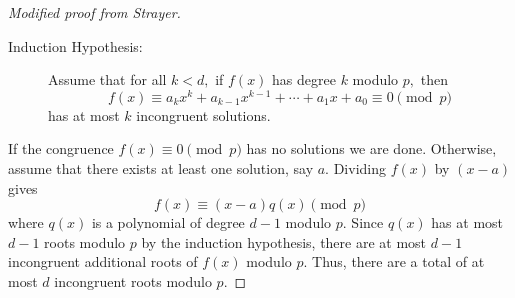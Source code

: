 \documentclass{ximera}
\begin{document}
\begin{theorem}[Lagrange]
\begin{proof}[Modified proof from Strayer]
\begin{description}
            \item[Induction Hypothesis:]
            Assume that for all $k\lt d,$ if $f(x)$ has degree $k$ modulo $p,$ then 
            \[f(x)\equiv a_k x^k +a_{k-1}x^{k-1}+\cdots+a_1x+a_0\equiv 0 \pmod{p}\]
            has at most $k$ incongruent solutions.
        \end{description}
        If the congruence $f(x)\equiv 0\pmod{p}$ has no solutions we are done. Otherwise, assume that there exists at least one solution, say $a.$ Dividing $f(x)$ by $(x-a)$ gives 
        \[f(x)\equiv (x-a)q(x)\pmod{p}\]
        where $q(x)$ is a polynomial of degree $d-1$ modulo $p.$
        Since $q(x)$ has at most $d-1$ roots modulo $p$ by the induction hypothesis, there are at most $d-1$ incongruent additional roots of $f(x)$ modulo $p$. Thus, there are a total of at most $d$ incongruent roots modulo $p.$
    \end{proof}
\end{theorem}
\end{document}
